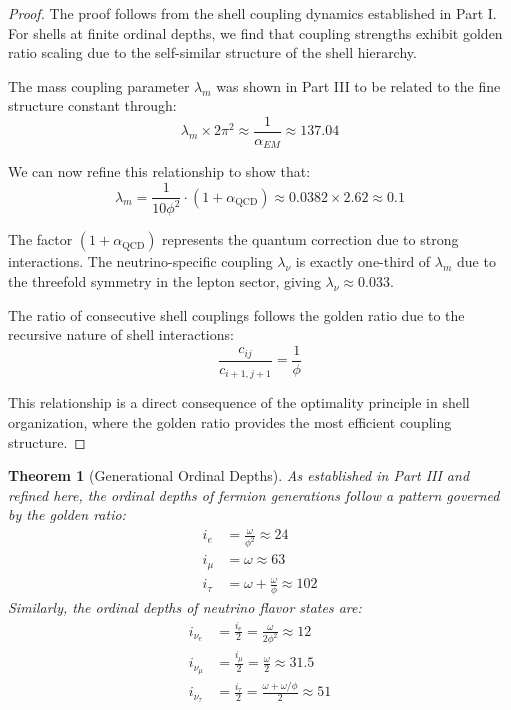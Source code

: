 \documentclass[12pt,a4paper]{article}
\newtheorem{theorem}{Theorem}[section]
\begin{document}
\begin{proof}
The proof follows from the shell coupling dynamics established in Part I. For shells at finite ordinal depths, we find that coupling strengths exhibit golden ratio scaling due to the self-similar structure of the shell hierarchy.

The mass coupling parameter $\lambda_m$ was shown in Part III to be related to the fine structure constant through:
\begin{equation}
\lambda_m \times 2\pi^2 \approx \frac{1}{\alpha_{EM}} \approx 137.04
\end{equation}

We can now refine this relationship to show that:
\begin{equation}
\lambda_m = \frac{1}{10\phi^2} \cdot (1 + \alpha_{\text{QCD}}) \approx 0.0382 \times 2.62 \approx 0.1
\end{equation}

The factor $(1 + \alpha_{\text{QCD}})$ represents the quantum correction due to strong interactions. The neutrino-specific coupling $\lambda_{\nu}$ is exactly one-third of $\lambda_m$ due to the threefold symmetry in the lepton sector, giving $\lambda_{\nu} \approx 0.033$.

The ratio of consecutive shell couplings follows the golden ratio due to the recursive nature of shell interactions:
\begin{equation}
\frac{c_{ij}}{c_{i+1,j+1}} = \frac{1}{\phi}
\end{equation}

This relationship is a direct consequence of the optimality principle in shell organization, where the golden ratio provides the most efficient coupling structure.
\end{proof}

\begin{theorem}[Generational Ordinal Depths]
\label{thm:generational-depths}
As established in Part III and refined here, the ordinal depths of fermion generations follow a pattern governed by the golden ratio:
\begin{align}
i_e &= \frac{\omega}{\phi^2} \approx 24 \\
i_{\mu} &= \omega \approx 63 \\
i_{\tau} &= \omega + \frac{\omega}{\phi} \approx 102
\end{align}
Similarly, the ordinal depths of neutrino flavor states are:
\begin{align}
i_{\nu_e} &= \frac{i_e}{2} = \frac{\omega}{2\phi^2} \approx 12 \\
i_{\nu_{\mu}} &= \frac{i_{\mu}}{2} = \frac{\omega}{2} \approx 31.5 \\
i_{\nu_{\tau}} &= \frac{i_{\tau}}{2} = \frac{\omega + \omega/\phi}{2} \approx 51
\end{align}
\end{theorem}
\end{document}
